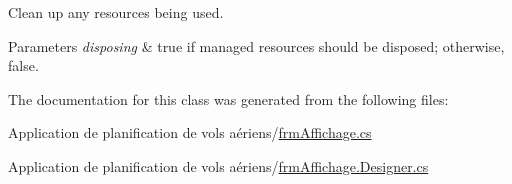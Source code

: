 Clean up any resources being used. 


\begin{DoxyParams}{Parameters}
{\em disposing} & true if managed resources should be disposed; otherwise, false.\\
\hline
\end{DoxyParams}


The documentation for this class was generated from the following files\+:\begin{DoxyCompactItemize}
\item 
Application de planification de vols aériens/\hyperlink{frm_affichage_8cs}{frm\+Affichage.\+cs}\item 
Application de planification de vols aériens/\hyperlink{frm_affichage_8_designer_8cs}{frm\+Affichage.\+Designer.\+cs}\end{DoxyCompactItemize}
